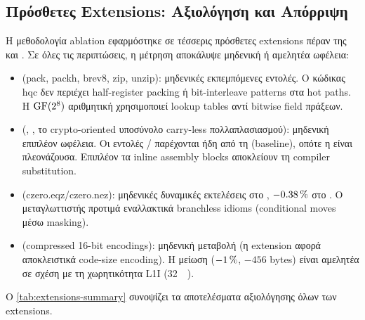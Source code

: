 \subsection{Πρόσθετες Extensions: Αξιολόγηση και Απόρριψη}
\label{ssec:extensions-dropped}

Η μεθοδολογία ablation εφαρμόστηκε σε τέσσερις πρόσθετες extensions πέραν
της  και . Σε όλες τις περιπτώσεις, η μέτρηση
αποκάλυψε μηδενική ή αμελητέα ωφέλεια:
%
\begin{itemize}
  \item \textbf{} (pack, packh, brev8, zip, unzip): μηδενικές
        εκπεμπόμενες εντολές. Ο κώδικας \gls{hqc} δεν περιέχει half-register
        packing ή bit-interleave patterns στα hot paths. Η $\mathrm{GF}(2^8)$
        αριθμητική χρησιμοποιεί lookup tables αντί bitwise field πράξεων.
  \item \textbf{} (, , το crypto-oriented
        υποσύνολο carry-less πολλαπλασιασμού): μηδενική επιπλέον ωφέλεια. Οι εντολές
        / παρέχονται ήδη από τη  (baseline),
        οπότε η  είναι πλεονάζουσα. Επιπλέον τα inline assembly blocks
        αποκλείουν τη compiler substitution.
  \item \textbf{} (czero.eqz/czero.nez): μηδενικές δυναμικές
        εκτελέσεις στο , $-\SI{0.38}{\percent}$ στο
        . Ο μεταγλωττιστής προτιμά εναλλακτικά branchless
        idioms (conditional moves μέσω  masking).
  \item \textbf{} (compressed 16-bit encodings): μηδενική μεταβολή
        \instret (η extension αφορά αποκλειστικά code-size encoding). Η
        μείωση  ($-\SI{1}{\percent}$, $-456$ bytes) είναι αμελητέα
        σε σχέση με τη χωρητικότητα L1I (\SI{32}{\kilo\byte}).
\end{itemize}
%
Ο \cref{tab:extensions-summary} συνοψίζει τα αποτελέσματα αξιολόγησης
όλων των extensions.

